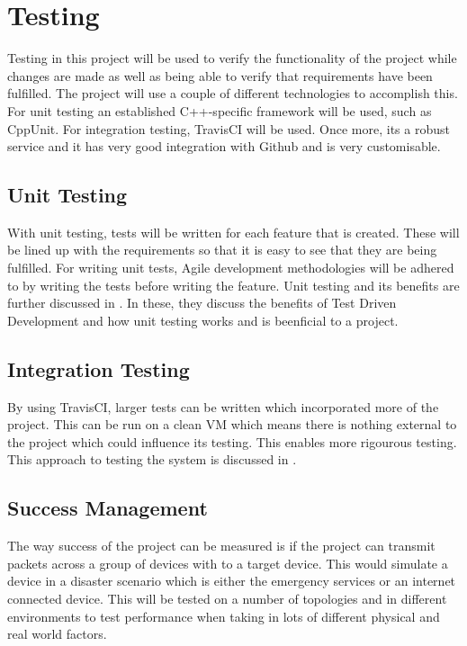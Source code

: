 \documentclass{report}
\begin{document}
\chapter*{Testing}

Testing in this project will be used to verify the functionality of the project while changes are made as 
well as being able to verify that requirements have been fulfilled. The project will use a couple of different 
technologies to accomplish this. For unit testing an established C++-specific framework will be used, such 
as CppUnit.
For integration testing, TravisCI will be used. Once more, its a robust service and it has very good integration with Github and 
is very customisable. 

\section*{Unit Testing}

With unit testing, tests will be written for each feature that is created. These will be lined up with the requirements so that 
it is easy to see that they are being fulfilled. For writing unit tests, Agile development methodologies will be adhered to by 
writing the tests before writing the feature. Unit testing and its benefits are further discussed in \cite{PressmanUnitIntegration, SommervilleTDD}. 
In these, they discuss the benefits of Test Driven Development and how unit testing works and is beenficial to a project. 

\section*{Integration Testing}

By using TravisCI, larger tests can be written which incorporated more of the project. This can be run on a clean VM which 
means there is nothing external to the project which could influence its testing. This enables more rigourous testing. This 
approach to testing the system is discussed in \cite{PressmanUnitIntegration}.

\section*{Success Management}

The way success of the project can be measured is if the project can transmit packets across a group of devices with to a 
target device. This would simulate a device in a disaster scenario which is either the emergency services or an internet 
connected device. This will be tested on a number of topologies and in different environments to test performance when taking 
in lots of different physical and real world factors.
\end{document}
